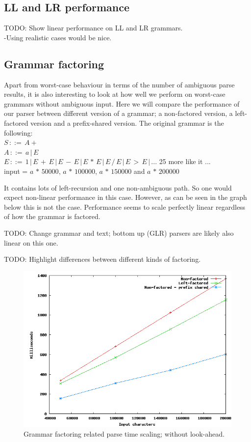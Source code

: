 \documentclass[a4paper,10pt]{article}
\begin{document}
\subsection{LL and LR performance}

TODO: Show linear performance on LL and LR grammars.\\
-Using realistic cases would be nice.

\subsection{Grammar factoring}

Apart from worst-case behaviour in terms of the number of ambiguous parse results, it is also interesting to look at how well we perform on worst-case grammars without ambiguous input. Here we will compare the performance of our parser between different version of a grammar; a non-factored version, a left-factored version and a prefix-shared version. The original grammar is the following:\\
$S\,::=\,A+$\\
$A\,::=\,a\,|\,E$\\
$E\,::=\,1\,|\,E\,+\,E\,|\,E\,-\,E\,|\,E\,*\,E\,|\,E\,/\,E\,|\,E\,>\,E\,|\,...$ 25 more like it ...\\
input = $a\,*\,50000$, $a\,*\,100000$, $a\,*\,150000$ and $a\,*\,200000$

It contains lots of left-recursion and one non-ambiguous path. So one would expect non-linear performance in this case. However, as can be seen in the graph below this is not the case. Performance seems to scale perfectly linear regardless of how the grammar is factored.

TODO: Change grammar and text; bottom up (GLR) parsers are likely also linear on this one.

TODO: Highlight differences between different kinds of factoring.

\begin{figure}[H]
\centering
\includegraphics[scale=0.5]{grammar-factoring.png}
\caption{Grammar factoring related parse time scaling; without look-ahead.}
\end{figure}
\end{document}

